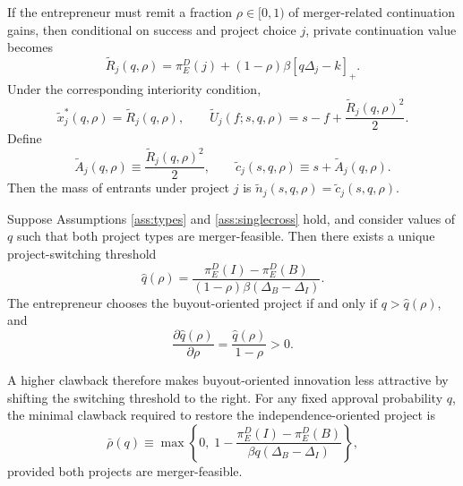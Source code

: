 If the entrepreneur must remit a fraction \(\rho \in [0,1)\) of merger-related continuation gains, then conditional on success and project choice \(j\), private continuation value becomes
\begin{equation}\label{eq:Rtilde}
    \widetilde R_j(q,\rho)
    =
    \pi_E^D(j)
    +
    (1-\rho)\beta [q\Delta_j-k]_+.
\end{equation}
Under the corresponding interiority condition,
\begin{equation}
    \widetilde x_j^*(q,\rho)=\widetilde R_j(q,\rho),
    \qquad
    \widetilde U_j(f;s,q,\rho)=s-f+\frac{\widetilde R_j(q,\rho)^2}{2}.
\end{equation}
Define
\begin{equation}
    \widetilde A_j(q,\rho)\equiv \frac{\widetilde R_j(q,\rho)^2}{2},
    \qquad
    \widetilde c_j(s,q,\rho)\equiv s+\widetilde A_j(q,\rho).
\end{equation}
Then the mass of entrants under project \(j\) is \(\widetilde n_j(s,q,\rho)=\widetilde c_j(s,q,\rho)\).

\begin{proposition}\label{prop:clawbackthreshold}
Suppose Assumptions \ref{ass:types} and \ref{ass:singlecross} hold, and consider values of \(q\) such that both project types are merger-feasible. Then there exists a unique project-switching threshold
\begin{equation}\label{eq:qhatrho}
    \hat q(\rho)
    =
    \frac{
        \pi_E^D(I)-\pi_E^D(B)
    }{
        (1-\rho)\beta(\Delta_B-\Delta_I)
    }.
\end{equation}
The entrepreneur chooses the buyout-oriented project if and only if \(q>\hat q(\rho)\), and
\begin{equation}\label{eq:dqhatdrho}
    \frac{\partial \hat q(\rho)}{\partial \rho}
    =
    \frac{\hat q(\rho)}{1-\rho}
    >0.
\end{equation}
\end{proposition}

A higher clawback therefore makes buyout-oriented innovation less attractive by shifting the switching threshold to the right. For any fixed approval probability \(q\), the minimal clawback required to restore the independence-oriented project is
\begin{equation}\label{eq:rhobar}
    \bar \rho(q)
    \equiv
    \max\left\{
        0,\;
        1-
        \frac{
            \pi_E^D(I)-\pi_E^D(B)
        }{
            \beta q(\Delta_B-\Delta_I)
        }
    \right\},
\end{equation}
provided both projects are merger-feasible.

